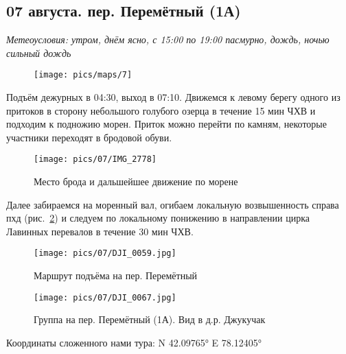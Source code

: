 \subsection{07 августа. пер. Перемётный (1А)}
\textit{Метеоусловия: утром, днём ясно, с 15:00 по 19:00 пасмурно, дождь, ночью сильный дождь}

\begin{figure}[h!]
	\centering
	\texttt{[image: pics/maps/7]}
	\label{fig:mini_18}
\end{figure}

Подъём дежурных в 04:30, выход в 07:10. Движемся к левому берегу одного из притоков в сторону небольшого голубого озерца в течение 15 мин ЧХВ и подходим к подножию морен. Приток можно перейти по камням, некоторые участники переходят в бродовой обуви.

\begin{figure}[h!]
	\centering
	\texttt{[image: pics/07/IMG\_2778]}
	\caption{Место брода и дальшейшее движение по морене}
	\label{fig:img2778}
\end{figure}

Далее забираемся на моренный вал, огибаем локальную возвышенность справа пхд (рис.~\ref{fig:img2778}) и следуем по локальному понижению в направлении цирка Лавинных перевалов в течение 30 мин ЧХВ.
\begin{figure}[h!]
	\centering
	\texttt{[image: pics/07/DJI\_0059.jpg]}
	\caption{Маршрут подъёма на пер. Перемётный}
	\label{fig:DJI_0059.jpg}
\end{figure}

\begin{figure}[h!]
	\centering
	\texttt{[image: pics/07/DJI\_0067.jpg]}
	\caption{Группа на пер. Перемётный (1А). Вид в д.р. Джукучак}
	\label{fig:DJI_0067.jpg}
\end{figure}

Координаты сложенного нами тура: N 42.09765° E 78.12405°

\clearpage